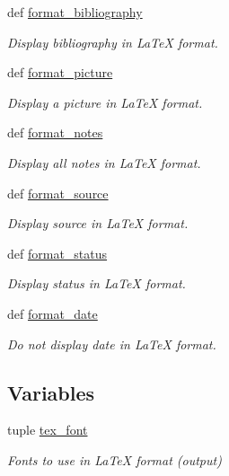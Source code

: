 \begin{DoxyCompactItemize}
def \hyperlink{namespacelmf_1_1src_1_1config_1_1tex_ac05eca439d560d531849a1442849758a}{format\+\_\+bibliography}
\begin{DoxyCompactList}\small\item\em Display bibliography in La\+Te\+X format. \end{DoxyCompactList}\item 
def \hyperlink{namespacelmf_1_1src_1_1config_1_1tex_ac13a98371b4866cff14c6850df581ad8}{format\+\_\+picture}
\begin{DoxyCompactList}\small\item\em Display a picture in La\+Te\+X format. \end{DoxyCompactList}\item 
def \hyperlink{namespacelmf_1_1src_1_1config_1_1tex_afaa2b8311d6b2b8c8e63a2c0429b31e9}{format\+\_\+notes}
\begin{DoxyCompactList}\small\item\em Display all notes in La\+Te\+X format. \end{DoxyCompactList}\item 
def \hyperlink{namespacelmf_1_1src_1_1config_1_1tex_afbf83cda950403465c8ab544ab178e76}{format\+\_\+source}
\begin{DoxyCompactList}\small\item\em Display source in La\+Te\+X format. \end{DoxyCompactList}\item 
def \hyperlink{namespacelmf_1_1src_1_1config_1_1tex_a573338d6a812b0bd8e9118b3adbf7525}{format\+\_\+status}
\begin{DoxyCompactList}\small\item\em Display status in La\+Te\+X format. \end{DoxyCompactList}\item 
def \hyperlink{namespacelmf_1_1src_1_1config_1_1tex_aee5ca2038f050c333b82dee3f1ae2522}{format\+\_\+date}
\begin{DoxyCompactList}\small\item\em Do not display date in La\+Te\+X format. \end{DoxyCompactList}\end{DoxyCompactItemize}
\subsection*{Variables}
\begin{DoxyCompactItemize}
\item 
tuple \hyperlink{namespacelmf_1_1src_1_1config_1_1tex_a043963d19472fa939f381b521e696cf6}{tex\+\_\+font}
\begin{DoxyCompactList}\small\item\em Fonts to use in La\+Te\+X format (output) \end{DoxyCompactList}\end{DoxyCompactItemize}


